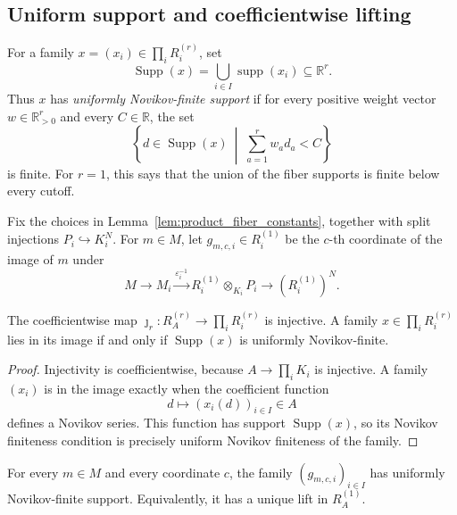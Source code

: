 \subsection{Uniform support and coefficientwise lifting}

For a family $x=(x_i)\in\prod_iR_i^{(r)}$, set
\[
  \operatorname{Supp}(x)=\bigcup_{i\in I}\operatorname{supp}(x_i)
  \subseteq\mathbb{R}^r.
\]
Thus $x$ has \emph{uniformly Novikov-finite support} if for every positive
weight vector $w\in\mathbb{R}_{>0}^r$ and every $C\in\mathbb{R}$, the set
\[
  \left\{d\in\operatorname{Supp}(x)\ \middle|\;
    \sum_{a=1}^r w_a d_a<C\right\}
\]
is finite.  For $r=1$, this says that the union of the fiber supports is finite
below every cutoff.

Fix the choices in Lemma~\ref{lem:product_fiber_constants}, together with split
injections $P_i\hookrightarrow K_i^N$.  For $m\in M$, let
$g_{m,c,i}\in R_i^{(1)}$ be the $c$-th coordinate of the image of $m$ under
\[
  M\longrightarrow M_i\xrightarrow{\varepsilon_i^{-1}}
  R_i^{(1)}\otimes_{K_i}P_i\longrightarrow (R_i^{(1)})^N.
\]

\begin{lemma}
  \label{lem:product_coefficientwise_range}
  \leanok
  The coefficientwise map
  $\jmath_r\colon R_A^{(r)}\to\prod_iR_i^{(r)}$ is injective.  A family
  $x\in\prod_iR_i^{(r)}$ lies in its image if and only if
  $\operatorname{Supp}(x)$ is uniformly Novikov-finite.
\end{lemma}

\begin{proof}
  \leanok
  Injectivity is coefficientwise, because $A\to\prod_iK_i$ is injective.  A
  family $(x_i)$ is in the image exactly when the coefficient function
  \[
    d\longmapsto (x_i(d))_{i\in I}\in A
  \]
  defines a Novikov series.  This function has support
  $\operatorname{Supp}(x)$, so its Novikov finiteness condition is precisely
  uniform Novikov finiteness of the family.
\end{proof}

\begin{lemma}
  \label{lem:product_coordinate_lifting}
  \leanok
  For every $m\in M$ and every coordinate $c$, the family
  $(g_{m,c,i})_{i\in I}$ has uniformly Novikov-finite support.  Equivalently,
  it has a unique lift in $R_A^{(1)}$.
\end{lemma}

